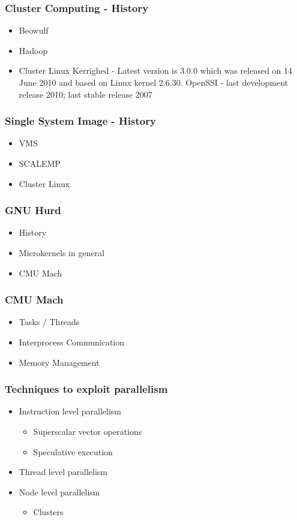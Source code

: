 \documentclass{beamer}
\begin{document}
\begin{frame}
\frametitle{Cluster Computing - History}
\begin{itemize}
\item Beowulf
\item Hadoop
\item Cluster Linux
Kerrighed - Latest version is 3.0.0 which was released on 14 June 2010 and based on Linux kernel 2.6.30.
OpenSSI - last development release 2010; last stable release 2007
\end{itemize}
\end{frame}

\begin{frame}
\frametitle{Single System Image - History}
\begin{itemize}
\item VMS
\item SCALEMP
\item Cluster Linux
\end{itemize}
\end{frame}

\begin{frame}
\frametitle{GNU Hurd}
\begin{itemize}
\item History
\item Microkernels in general
\item CMU Mach
\end{itemize}
\end{frame}

\begin{frame}
\frametitle{CMU Mach}
\begin{itemize}
\item Tasks / Threads
\item Interprocess Communication
\item Memory Management
\end{itemize}
\end{frame}

\begin{frame}
\frametitle{Techniques to exploit parallelism}
\begin{itemize}
\item Instruction level parallelism
\begin{itemize}
\item Superscalar vector operations
\item Speculative execution
\end{itemize}
\item Thread level parallelism
\item Node level parallelism
\begin{itemize}
\item Clusters
\end{itemize}
\end{itemize}
\end{frame}
\end{document}
